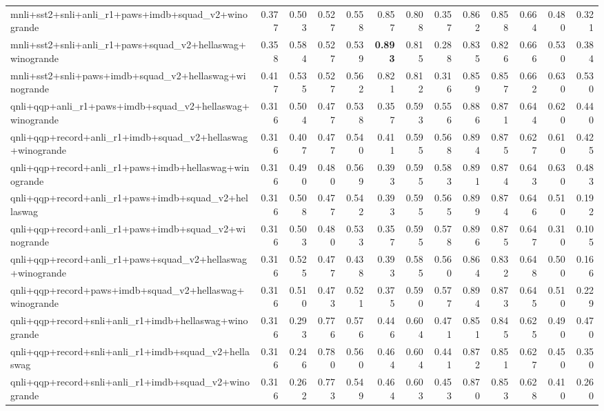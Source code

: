 \begin{table}[t]
\begin{tabular}{lrrrrrrrrrrrr}
    mnli+sst2+snli+anli\_r1+paws+imdb+squad\_v2+winogrande & 0.377 & 0.503 & 0.527 & 0.558 & 0.857 & 0.808 & 0.357 & 0.862 & 0.858 & 0.664 & 0.480 & 0.321 \\
    mnli+sst2+snli+anli\_r1+paws+squad\_v2+hellaswag+winogrande & 0.358 & 0.584 & 0.527 & 0.539 & \textbf{0.893} & 0.815 & 0.288 & 0.835 & 0.826 & 0.666 & 0.530 & 0.384 \\
    mnli+sst2+snli+paws+imdb+squad\_v2+hellaswag+winogrande & 0.417 & 0.535 & 0.527 & 0.562 & 0.821 & 0.812 & 0.316 & 0.859 & 0.857 & 0.662 & 0.630 & 0.530 \\
    qnli+qqp+anli\_r1+paws+imdb+squad\_v2+hellaswag+winogrande & 0.316 & 0.504 & 0.477 & 0.538 & 0.357 & 0.593 & 0.556 & 0.886 & 0.871 & 0.644 & 0.620 & 0.440 \\
    qnli+qqp+record+anli\_r1+imdb+squad\_v2+hellaswag+winogrande & 0.316 & 0.407 & 0.477 & 0.540 & 0.411 & 0.595 & 0.568 & 0.894 & 0.875 & 0.627 & 0.610 & 0.425 \\
    qnli+qqp+record+anli\_r1+paws+imdb+hellaswag+winogrande & 0.316 & 0.490 & 0.480 & 0.569 & 0.393 & 0.595 & 0.583 & 0.891 & 0.874 & 0.643 & 0.630 & 0.483 \\
    qnli+qqp+record+anli\_r1+paws+imdb+squad\_v2+hellaswag & 0.316 & 0.508 & 0.477 & 0.542 & 0.393 & 0.595 & 0.565 & 0.899 & 0.874 & 0.646 & 0.510 & 0.192 \\
    qnli+qqp+record+anli\_r1+paws+imdb+squad\_v2+winogrande & 0.316 & 0.503 & 0.480 & 0.533 & 0.357 & 0.595 & 0.578 & 0.896 & 0.875 & 0.647 & 0.310 & 0.105 \\
    qnli+qqp+record+anli\_r1+paws+squad\_v2+hellaswag+winogrande & 0.316 & 0.525 & 0.477 & 0.438 & 0.393 & 0.585 & 0.560 & 0.864 & 0.832 & 0.648 & 0.500 & 0.166 \\
    qnli+qqp+record+paws+imdb+squad\_v2+hellaswag+winogrande & 0.316 & 0.510 & 0.473 & 0.521 & 0.375 & 0.590 & 0.577 & 0.894 & 0.873 & 0.645 & 0.510 & 0.229 \\
    qnli+qqp+record+snli+anli\_r1+imdb+hellaswag+winogrande & 0.316 & 0.293 & 0.776 & 0.576 & 0.446 & 0.604 & 0.471 & 0.851 & 0.845 & 0.625 & 0.490 & 0.470 \\
    qnli+qqp+record+snli+anli\_r1+imdb+squad\_v2+hellaswag & 0.316 & 0.246 & 0.780 & 0.560 & 0.464 & 0.604 & 0.441 & 0.872 & 0.851 & 0.627 & 0.450 & 0.350 \\
    qnli+qqp+record+snli+anli\_r1+imdb+squad\_v2+winogrande & 0.316 & 0.262 & 0.773 & 0.549 & 0.464 & 0.603 & 0.453 & 0.870 & 0.853 & 0.628 & 0.410 & 0.260 \\

\end{tabular}
\end{table}
